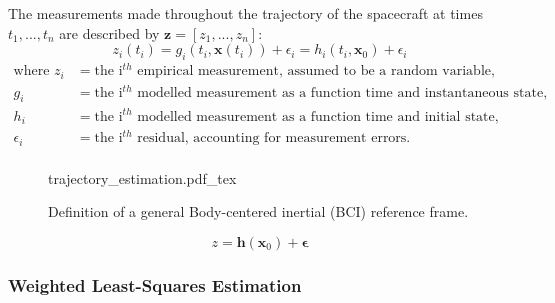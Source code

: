 The measurements made throughout the trajectory of the spacecraft at times
$t_1,...,t_n$ are described by $\bm{z}=[z_1,...,z_n]$:
\begin{equation}
    z_i(t_i) = g_i(t_i, \bm{x}(t_i))+\epsilon_i = h_i(t_i, \bm{x}_0)+\epsilon_i
\end{equation}
\begin{equation*}
    \begin{aligned}
        \textrm{where  }
            z_i &= \text{the i$^{th}$ empirical measurement, assumed to be a random variable,} \\
            g_i &= \text{the i$^{th}$ modelled measurement as a function time and instantaneous state,} \\
            h_i &= \text{the i$^{th}$ modelled measurement as a function time and initial state,} \\
            \epsilon_i &= \text{the i$^{th}$ residual, accounting for measurement errors.} \\
    \end{aligned}
\end{equation*}

\begin{figure}[h]
    \centering
    \def\svgwidth{0.95\linewidth}
    {trajectory_estimation.pdf_tex}
    \caption{Definition of a general Body-centered inertial (BCI) reference frame.}
    \label{fig:as}
\end{figure}



%




\begin{equation}
    z = \mathbf{h}(\mathbf{x}_0) + \mathbf{\epsilon}
\end{equation}

\newpage\subsubsection{Weighted Least-Squares Estimation}

